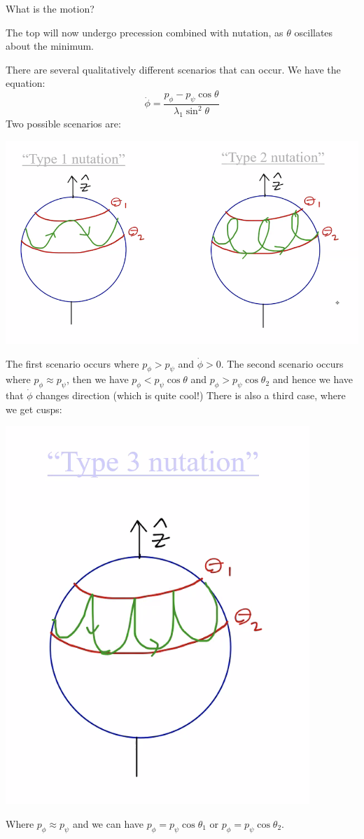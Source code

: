 \documentclass[../PHYS306Notes.tex]{subfiles}
\begin{document}
What is the motion?
\begin{s}
The top will now undergo precession combined with nutation, as $\theta$ oscillates about the minimum. 
\end{s}
There are several qualitatively different scenarios that can occur. We have the equation:
\[\dot{\phi} = \frac{p_\phi - p_\psi\cos\theta}{\lambda_1\sin^2\theta}\]
Two possible scenarios are:
\begin{center}
    \includegraphics[scale=1]{Lecture-22/l22-img4.png}
\end{center}
The first scenario occurs where $p_\phi > p_\psi$ and $\dot{\phi} > 0$. The second scenario occurs where $p_\phi \approx p_\psi$, then we have $p_\phi < p_\psi\cos\theta$ and $p_\phi > p_\psi\cos\theta_2$ and hence we have that $\dot{\phi}$ changes direction (which is quite cool!) There is also a third case, where we get cusps:
\begin{center}
    \includegraphics[scale=0.8]{Lecture-22/l22-img5.png}
\end{center}
Where $p_\phi \approx p_\psi$ and we can have $p_\phi = p_\psi\cos\theta_1$ or $p_\phi = p_\psi\cos\theta_2$.
\end{document}
